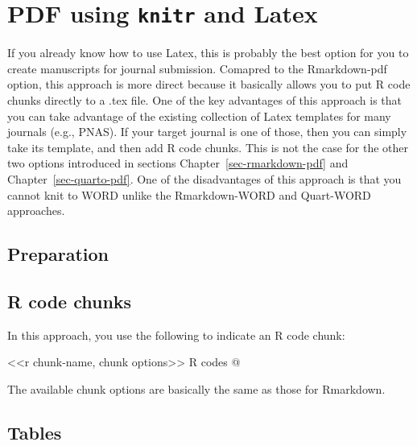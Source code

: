 \documentclass[
  letterpaper,
  DIV=11,
  numbers=noendperiod]{scrreprt}
\newenvironment{Shaded}{\begin{snugshade}}{\end{snugshade}}
\newcommand{\NormalTok}[1]{\textcolor[rgb]{0.00,0.23,0.31}{#1}}
\begin{document}

\hypertarget{sec-pdf-knitr-latex}{%
\chapter{\texorpdfstring{PDF using \texttt{knitr} and
Latex}{PDF using knitr and Latex}}\label{sec-pdf-knitr-latex}}

If you already know how to use Latex, this is probably the best option
for you to create manuscripts for journal submission. Comapred to the
Rmarkdown-pdf option, this approach is more direct because it basically
allows you to put R code chunks directly to a .tex file. One of the key
advantages of this approach is that you can take advantage of the
existing collection of Latex templates for many journals (e.g., PNAS).
If your target journal is one of those, then you can simply take its
template, and then add R code chunks. This is not the case for the other
two options introduced in sections Chapter~\ref{sec-rmarkdown-pdf} and
Chapter~\ref{sec-quarto-pdf}. One of the disadvantages of this approach
is that you cannot knit to WORD unlike the Rmarkdown-WORD and Quart-WORD
approaches.

\hypertarget{preparation-2}{%
\section{Preparation}\label{preparation-2}}

\hypertarget{r-code-chunks}{%
\section{R code chunks}\label{r-code-chunks}}

In this approach, you use the following to indicate an R code chunk:

\begin{Shaded}
\begin{Highlighting}[]
\NormalTok{\textless{}\textless{}r chunk{-}name, chunk options\textgreater{}\textgreater{}}
\NormalTok{R codes}
\NormalTok{@}
\end{Highlighting}
\end{Shaded}

The available chunk options are basically the same as those for
Rmarkdown.

\hypertarget{tables-2}{%
\section{Tables}\label{tables-2}}
\end{document}
